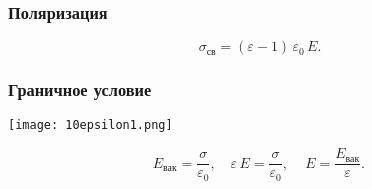 \documentclass[12pt, a4paper]{article}
\begin{document}
\subsubsection*{Поляризация}
\[
\sigma_{\text{св}} = (\varepsilon-1)\,\varepsilon_0\,E.
\]

\subsubsection*{Граничное условие}

\begin{center}
\texttt{[image: 10epsilon1.png]}
\end{center}

\[
E_{\text{вак}}=\frac{\sigma}{\varepsilon_0}, \quad
\varepsilon\,E=\frac{\sigma}{\varepsilon_0}, \quad
\boxed{\,E=\frac{E_{\text{вак}}}{\varepsilon}.\,}
\]
\end{document}

